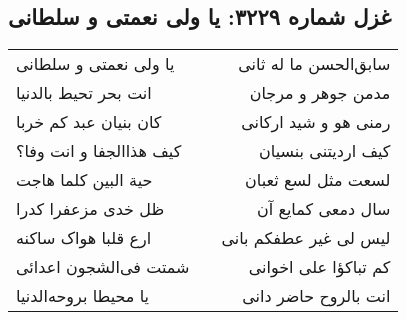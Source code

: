 \begin{center}
\section*{غزل شماره ۳۲۲۹: یا ولی نعمتی و سلطانی}
\label{sec:3229}
\begin{longtable}{l p{0.5cm} r}
یا ولی نعمتی و سلطانی
&&
سابق‌الحسن ما له ثانی
\\
انت بحر تحیط بالدنیا
&&
مدمن جوهر و مرجان
\\
کان بنیان عبد کم خربا
&&
رمنی هو و شید ارکانی
\\
کیف هذاالجفا و انت وفا؟
&&
کیف اردیتنی بنسیان
\\
حیة البین کلما هاجت
&&
لسعت مثل لسع ثعبان
\\
ظل خدی مزعفرا کدرا
&&
سال دمعی کمایع آن
\\
ارع قلبا هواک ساکنه
&&
لیس لی غیر عطفکم بانی
\\
شمتت فی‌الشجون اعدائی
&&
کم تباکؤا علی اخوانی
\\
یا محیطا بروحه‌الدنیا
&&
انت بالروح حاضر دانی
\\
\end{longtable}
\end{center}
